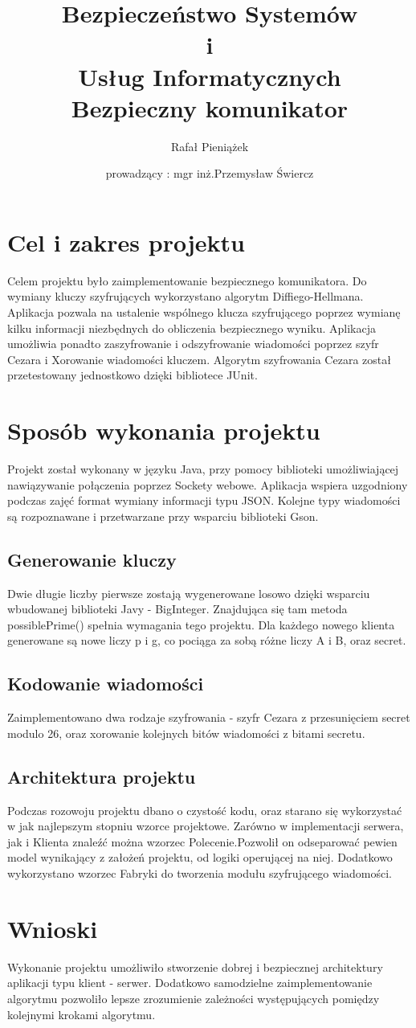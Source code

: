 \documentclass[12pt, a4paper, notitlepage]{report}
\title{Bezpieczeństwo Systemów\\ i\\ Usług Informatycznych\\  Bezpieczny komunikator }
\author{Rafał Pieniążek}
\date{prowadzący : mgr inż.Przemysław Świercz }
\begin{document}
	\maketitle
	\newpage
	\section{Cel i zakres projektu}
		Celem projektu było zaimplementowanie bezpiecznego komunikatora. Do wymiany kluczy szyfrujących wykorzystano algorytm Diffiego-Hellmana. Aplikacja pozwala na ustalenie wspólnego klucza szyfrującego poprzez wymianę kilku informacji niezbędnych do obliczenia bezpiecznego wyniku. Aplikacja umożliwia ponadto zaszyfrowanie i odszyfrowanie wiadomości poprzez szyfr Cezara i Xorowanie wiadomości kluczem. Algorytm szyfrowania Cezara został przetestowany jednostkowo dzięki bibliotece JUnit.
	\section{Sposób wykonania projektu}
		Projekt został wykonany w języku Java, przy pomocy biblioteki umożliwiającej nawiązywanie połączenia poprzez Sockety webowe. Aplikacja wspiera uzgodniony podczas zajęć format wymiany informacji typu JSON. Kolejne typy wiadomości są rozpoznawane i przetwarzane przy wsparciu biblioteki Gson.
		\subsection{Generowanie kluczy}
			Dwie długie liczby pierwsze zostają wygenerowane losowo dzięki wsparciu wbudowanej biblioteki Javy - BigInteger. Znajdująca się tam metoda possiblePrime() spełnia wymagania tego projektu. Dla każdego nowego klienta generowane są nowe liczy p i g, co pociąga za sobą różne liczy A i B, oraz secret. 
		\subsection{Kodowanie wiadomości}
			Zaimplementowano dwa rodzaje szyfrowania - szyfr Cezara z przesunięciem secret modulo 26, oraz xorowanie kolejnych bitów wiadomości z bitami secretu.
		\subsection{Architektura projektu}
			Podczas rozowoju projektu dbano o czystość kodu, oraz starano się wykorzystać w jak najlepszym stopniu wzorce projektowe. Zarówno w implementacji serwera, jak i Klienta znaleźć można wzorzec Polecenie.Pozwolił on odseparować pewien model wynikający z założeń projektu, od logiki operującej na niej. Dodatkowo wykorzystano wzorzec Fabryki do tworzenia modułu szyfrującego wiadomości.
	
	\section{Wnioski}
		Wykonanie projektu umożliwiło stworzenie dobrej i bezpiecznej architektury aplikacji typu klient - serwer. Dodatkowo samodzielne zaimplementowanie algorytmu pozwoliło lepsze zrozumienie zależności występujących pomiędzy kolejnymi krokami algorytmu.
\end{document}
